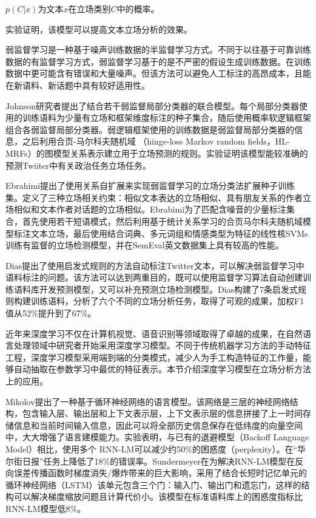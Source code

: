$p(C|x)$为文本$x$在立场类别$C$中的概率。

实验证明，该模型可以提高文本立场分析的效果。

弱监督学习是一种基于噪声训练数据的半监督学习方式。不同于以往基于可靠训练数据的有监督学习方式，弱监督学习基于的是不严密的假设生成训练数据。在训练数据中更可能含有错误和大量噪声。但该方法可以避免人工标注的高昂成本，且能在新语料、新话题中具有较好适用性。

Johnson研究者提出了结合若干弱监督局部分类器的联合模型。每个局部分类器使用的训练语料为少量有立场和框架维度标注的种子集合，随后使用概率软逻辑框架组合各弱监督局部分类器。弱逻辑框架使用的训练数据是弱监督局部分类器的信息，之后利用合页-马尔科夫随机域 （hinge-loss Markov random fields，HL- MRFs）的图模型关系表示建立用于立场预测的规则。实验证明该模型能较准确的预测Twiiter中有关政治任务立场任务。

Ebrahimi提出了使用关系自扩展来实现弱监督学习的立场分类法扩展种子训练集。定义了三种立场相关约束：相似文本表达的立场相似、具有朋友关系的作者立场相似和文本作者对话题的立场相似。Ebrabimi为了匹配含噪音的少量标注集合，首先使用若干短语模式，然后利用基于统计关系学习的合页马尔科夫随机域模型标注文本立场，最后使用结合词典、多元词组和情感类型为特征的线性核SVMs训练有监督的立场检测模型，并在SemEval英文数据集上具有较高的性能。

Dias提出了使用启发式规则的方法自动标注Twitter文本，可以解决弱监督学习中语料标注的问题。该方法可以达到两重目的，既可以使用监督学习算法自动创建训练语料库开发预测模型，又可以补充预测立场检测模型。Dias构建了7条启发式规则构建训练语料，分析了六个不同的立场分析任务，取得了可观的成果，加权F1值从52\%提升到了67\%。



近年来深度学习不仅在计算机视觉、语音识别等领域取得了卓越的成果，在自然语言处理领域中研究者开始采用深度学习模型。不同于传统机器学习方法的手动特征工程，深度学习模型采用端到端的分类模式，减少人为手工构造特征的工作量，能够自动抽取在参数学习中最优的特征表示。本节介绍深度学习模型在立场分析方法上的应用。

Mikolov提出了一种基于循环神经网络的语言模型。该网络是三层的神经网络结构，包含输入层、输出层和上下文表示层，上下文表示层的信息拼接了上一时间存储信息和当前时间输入信息，因此可以将全部历史信息保存在低纬度的向量空间中，大大增强了语言建模能力。实验表明，与已有的退避模型（Backoff Language Model）相比，使用多个 RNN-LM可以减少约50\%的困惑度（perplexity）。在“华尔街日报”任务上降低了18\%的错误率。Sundermeyer在为解决RNN-LM模型在反向误差传播函数时梯度消失/爆炸带来的巨大影响，采用了结合长短时记忆单元的循环神经网络（LSTM）该单元包含三个门：输入门、输出门和遗忘门，这样的结构可以解决梯度缩放问题且计算代价小。该模型在标准语料库上的困惑度指标比RNN-LM模型低8\%。

